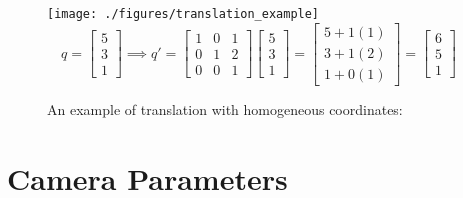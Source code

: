 \documentclass[
    12pt,
    twoside,
    bibstyle=chicago,
    headerstyle=uppercase,
	bibfile=thesis.bib
]{reedthesis}
\begin{document}



\begin{figure}[t]
	   
	    \centering
	    
	    \texttt{[image: ./figures/translation\_example]}
	    \[q = \begin{bmatrix}5\\3\\1\end{bmatrix} \implies q' = \begin{bmatrix}1&0&1\\0&1&2\\0&0&1\end{bmatrix}\begin{bmatrix}5\\3\\1\end{bmatrix} = \begin{bmatrix}5 + 1(1)\\3 + 1(2)\\1 + 0(1)\end{bmatrix}= \begin{bmatrix}6\\5\\1\end{bmatrix}
	    \]
	    \caption{An example of translation with homogeneous coordinates:}
	 \label{Translation Example}
	\end{figure}
	


\section{Camera Parameters}
\end{document}
